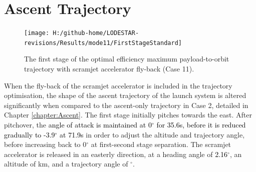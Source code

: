 \section{Ascent Trajectory}

\begin{figure}[ht]%
	\centering
	\texttt{[image: H:/github-home/LODESTAR-revisions/Results/mode11/FirstStageStandard]}
	\caption{The first stage of the optimal efficiency maximum payload-to-orbit trajectory with scramjet accelerator fly-back (Case 11). }
	\label{fig:FirstStageStandard}
\end{figure}
When the fly-back of the scramjet accelerator is included in the trajectory optimisation, the shape of the ascent trajectory of the launch system is altered significantly when compared to the ascent-only trajectory in Case 2, detailed in Chapter \ref{chapter:Ascent}.
 The first stage initially pitches towards the east.
 After pitchover, the \textcolor{black}{angle of attack is maintained at 0$^\circ$ for 35.6s, before it is reduced gradually to -3.9$^\circ$ at 71.9s} in order to adjust the altitude and trajectory angle, before increasing back to 0$^\circ$ at first-second stage separation. 
 The scramjet accelerator is released in an easterly direction, at a heading angle of \textcolor{black}{2.16}$^\circ$, an altitude of \firstsecondSeparationAltStandard km, and a trajectory angle of \firstsecondSeparationgammaStandard $^\circ$. 
 

